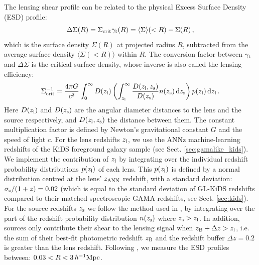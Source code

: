 \documentclass[usenatbib]{mnras}
\newcommand{\hMpc}{\, h^{-1}{\rm{Mpc}} }
\newcommand*{\meanb}[1]{\langle{#1}\rangle}
\newcommand{\un}[1]{_{\rm #1}}
\begin{document}
The lensing shear profile can be related to the physical Excess Surface Density (ESD) profile:
\begin{equation}
	\Delta \Sigma (R) = \Sigma\un{crit} \gamma\un{t}(R) = \meanb{\Sigma}(<R) - \Sigma(R) \, ,
	\label{eq:deltasigma}
\end{equation}
which is the surface density $\Sigma(R)$ at projected radius $R$, subtracted from the average surface density $\meanb{\Sigma(<R)}$ within $R$. The conversion factor between $\gamma\un{t}$ and $\Delta\Sigma$ is the critical surface density, whose inverse is also called the lensing efficiency:
\begin{equation}
	\Sigma\un{crit}^{-1} = \frac{4\pi G}{c^2} \int_{0}^{\infty} D(z\un{l}) \left( \int_{z\un{l}}^{\infty}  \frac{D(z\un{l}, z\un{s})}{D(z\un{s})} n(z\un{s}) \, {\rm d} z\un{s} \right) p(z\un{l}) \, {\rm d} z\un{l} \, .
	\label{eq:sigmacrit}
\end{equation}
Here $D(z\un{l})$ and $D(z\un{s})$ are the angular diameter distances to the lens and the source respectively, and $D(z\un{l}, z\un{s})$ the distance between them. The constant multiplication factor is defined by Newton's gravitational constant $G$ and the speed of light $c$. For the lens redshifts $z\un{l}$, we use the ANNz machine-learning redshifts of the KiDS foreground galaxy sample (see Sect. \ref{sec:gamalike_kids}). We implement the contribution of $z\un{l}$ by integrating over the individual redshift probability distributions $p(z\un{l})$ of each lens. This $p(z\un{l})$ is defined by a normal distribution centred at the lens' $z\un{ANN}$ redshift, with a standard deviation: $\sigma\un{z}/(1+z) = 0.02$ (which is equal to the standard deviation of GL-KiDS redshifts compared to their matched spectroscopic GAMA redshifts, see Sect. \ref{sec:kids}). For the source redshifts $z\un{s}$ we follow the method used in \cite{dvornik2018}, by integrating over the part of the redshift probability distribution $n(z\un{s})$ where $z\un{s}>z\un{l}$. In addition, sources only contribute their shear to the lensing signal when $z\un{B}+\Delta z > z\un{l}$, i.e. the sum of their best-fit photometric redshift $z\un{B}$ and the redshift buffer $\Delta z=0.2$ is greater than the lens redshift. Following \cite{brouwer2017}, we measure the ESD profiles between: $0.03 < R < 3 \hMpc$.
\end{document}

